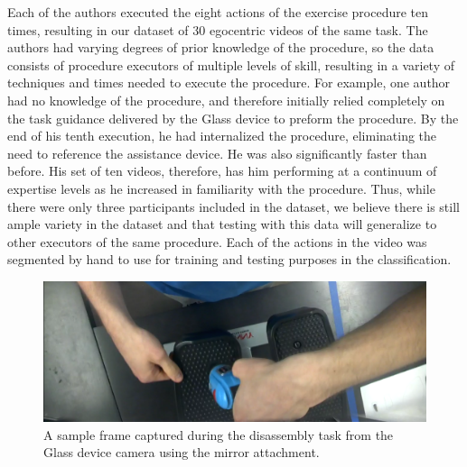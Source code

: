 \documentclass[10pt,twocolumn,letterpaper]{article}
\begin{document}
Each of the authors executed the eight actions of the exercise procedure ten times, resulting in our dataset of 30 egocentric videos of the same task. The authors had varying degrees of prior knowledge of the procedure, so the data consists of procedure executors of multiple levels of skill, resulting in a variety of techniques and times needed to execute the procedure. For example, one author had no knowledge of the procedure, and therefore initially relied completely on the task guidance delivered by the Glass device to preform the procedure. By the end of his tenth execution, he had internalized the procedure, eliminating the need to reference the assistance device. He was also significantly faster than before. His set of ten videos, therefore, has him performing at a continuum of expertise levels as he increased in familiarity with the procedure. Thus, while there were only three participants included in the dataset, we believe there is still ample variety in the dataset and that testing with this data will generalize to other executors of the same procedure. Each of the actions in the video was segmented by hand to use for training and testing purposes in the classification.

\begin{figure}[!t]
    \centering
    \includegraphics[width=\columnwidth]{fig/legomyegocentricview.png}
    \caption{A sample frame captured during the disassembly task from the Glass device camera using the mirror attachment.}
    \label{fig:egocentric}
\end{figure}
\end{document}
